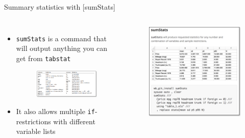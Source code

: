 \documentclass[aspectratio=169]{beamer}
\begin{document}
\begin{frame}[fragile]{Summary statistics with [sumStats]}
	\begin{columns}[c]
		\begin{itemize}
			\item \texttt{sumStats} is a command that will output anything you can get from \texttt{tabstat}
			\begin{figure}
				\centering
				\includegraphics[width=\linewidth]{img/sumstats}
			\end{figure}
			\item It also allows multiple \texttt{if}-restrictions with different variable lists
		\end{itemize}
		\begin{figure}
			\centering
			\includegraphics[width=\linewidth]{img/sumstats2}
		\end{figure}
	\end{columns}
\end{frame}
\end{document}
